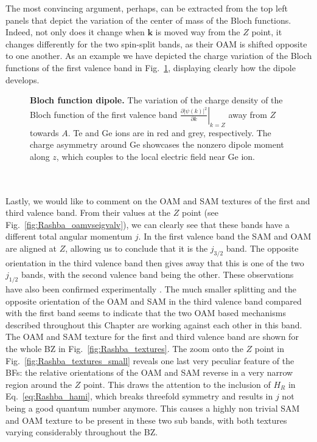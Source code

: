 The most convincing argument, perhaps, can be extracted from the top left panels that depict the variation of the center of mass of the Bloch functions. Indeed, not only does it change when $\bm k$ is moved way from the $Z$ point, it changes differently for the two spin-split bands, as their OAM is shifted opposite to one another.
As an example we have depicted the charge variation of the Bloch functions of the first valence band in Fig.~\ref{fig:Rashba_diffdens}, displaying clearly how the dipole develops.
\begin{figure}
	\centering
{}
\caption{\label{fig:Rashba_diffdens}{\bf Bloch function dipole.} The variation of the charge density of the Bloch function of the first valence band $\left.\frac{\partial |\psi(k)|^2}{\partial k}\right\rvert_{k=Z}$ away from $Z$ towards $A$. Te and Ge ions are in red and grey, respectively. The charge asymmetry around Ge showcases the nonzero dipole moment along $z$, which couples to the local electric field near Ge ion.}
\end{figure}
\\\\
Lastly, we would like to comment on the OAM and SAM textures of the first and third valence band.
From their values at the $Z$ point (see Fig.~\ref{fig:Rashba_oamvseigvalv}), we can clearly see that these bands have a different total angular momentum $j$.
In the first valence band the SAM and OAM are aligned at $Z$, allowing us to conclude that it is the $j_{3/2}$ band. The opposite orientation in the third valence band then gives away that this is one of the two $j_{1/2}$ bands, with the second valence band being the other.
These observations have also been confirmed experimentally \cite{Krempasky2015}.
The much smaller splitting and the opposite orientation of the OAM and SAM in the third valence band compared with the first band seems to indicate that the two OAM based mechanisms described throughout this Chapter are working against each other in this band.
The OAM and SAM texture for the first and third valence band are shown for the whole BZ in Fig.~\ref{fig:Rashba_textures}.
The zoom onto the $Z$ point in Fig.~\ref{fig:Rashba_textures_small} reveals one last very peculiar feature of the BFs: the relative orientations of the OAM and SAM reverse in a very narrow region around the $Z$ point.
This draws the attention to the inclusion of $H_R$ in Eq.~\eqref{eq:Rashba_hami}, which breaks threefold symmetry and results in $j$ not being a good quantum number anymore. This causes a highly non trivial SAM and OAM texture to be present in these two sub bands, with both textures varying considerably throughout the BZ. 


